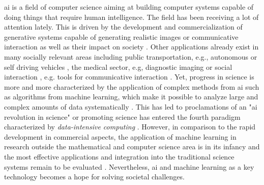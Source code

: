  
\Gls{ai} is a field of computer science aiming at building computer systems capable of doing things that require human intelligence. The field has been receiving a lot of attention lately. This is driven by the development and commercialization of generative systems capable of generating realistic images or communicative interaction as well as their impact on society \cite{lin2023}. Other applications already exist in many socially relevant areas including public transportation, e.g., autonomous or self driving vehicles \cite{Leonard2020}, the medical sector, e.g, diagnostic imaging \cite{Liu2020} or social interaction \cite{Adamopoulou2020}, e.g. tools for communicative interaction \cite{Chatgpt_openai_web}. Yet, progress in science is more and more characterized by the application of complex methods from \gls{ai} such as algorithms from machine learning, which make it possible to analyze large and complex amounts of data systematically \cite{Brunton2019}. This has led to proclamations of an "\gls{ai} revolution in science" \cite{Appenzeller2017} or promoting science has entered the fourth paradigm characterized by \textit{data-intensive computing} \cite{Hey2009}. However, in comparison to the rapid development in commercial aspects, the application of machine learning in research outside the mathematical and computer science area is in its infancy and the most effective applications and integration into the traditional science systems remain to be evaluated \cite{Bzdok2019}.  Nevertheless, \gls{ai} and machine learning as a key technology becomes a hope for solving societal challenges.\\
